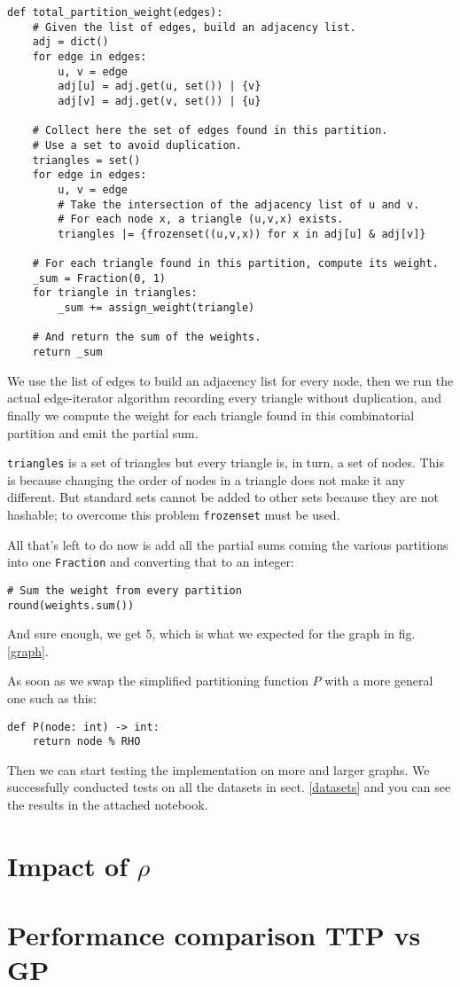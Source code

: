 \documentclass[paper=a4, fontsize=11pt]{scrartcl}
\begin{document}
\begin{verbatim}
def total_partition_weight(edges):
    # Given the list of edges, build an adjacency list.
    adj = dict()
    for edge in edges:
        u, v = edge
        adj[u] = adj.get(u, set()) | {v}
        adj[v] = adj.get(v, set()) | {u}
        
    # Collect here the set of edges found in this partition.
    # Use a set to avoid duplication.
    triangles = set()
    for edge in edges:
        u, v = edge
        # Take the intersection of the adjacency list of u and v.
        # For each node x, a triangle (u,v,x) exists.
        triangles |= {frozenset((u,v,x)) for x in adj[u] & adj[v]}
    
    # For each triangle found in this partition, compute its weight.
    _sum = Fraction(0, 1)
    for triangle in triangles:
        _sum += assign_weight(triangle)
        
    # And return the sum of the weights.
    return _sum
\end{verbatim}

We use the list of edges to build an adjacency list for every node, then we run
the actual edge-iterator algorithm recording every triangle without duplication,
and finally we compute the weight for each triangle found in this combinatorial
partition and emit the partial sum.

\texttt{triangles} is a set of triangles but every triangle is, in
turn, a set of nodes. This is because changing the order of nodes in a triangle
does not make it any different. But standard sets cannot be added to other sets
because they are not hashable; to overcome this problem
\texttt{frozenset} must be used.

All that's left to do now is add all the partial sums coming the various
partitions into one \texttt{Fraction} and converting that to an
integer:
\begin{verbatim}
# Sum the weight from every partition
round(weights.sum())
\end{verbatim}
And sure enough, we get 5, which is what we expected for the graph in fig.
\ref{graph}.

As soon as we swap the simplified partitioning function $P$ with a more general
one such as this:
\begin{verbatim}
def P(node: int) -> int:
    return node % RHO
\end{verbatim}
Then we can start testing the implementation on more and larger graphs. We
successfully conducted tests on all the datasets in sect. \ref{datasets} and you
can see the results in the attached notebook.

\section{Impact of $\rho$}

\section{Performance comparison TTP vs GP}



\end{document}
